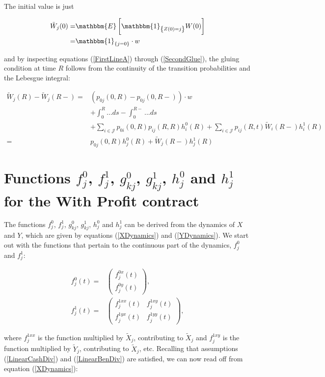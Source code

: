 \documentclass{article}
\newcommand{\1}[1]{\mathbbm{1}_{\left\lbrace #1 \right\rbrace}}
\newcommand{\expec}[1][def]{\mathbbm{E} \left[ #1 \right]}
\theoremstyle{break}
\theoremstyle{remark}
\numberwithin{equation}{section}
\begin{document}
\begin{appendices}
The initial value is just

\begin{align*}
	\tilde{W}_j(0) =& \expec[\1{Z(0)=j} W(0)] \\
	=& \1{j=0} \cdot w
\end{align*}

and by inspecting equations (\ref{FirstLineA}) through (\ref{SecondGlue}), the gluing condition at time $R$ follows from the continuity of the transition probabilities and the Lebesgue integral:

\begin{align*}
	\tilde{W}_j(R) - \tilde{W}_j(R-) =& \left(p_{0j}(0,R) - p_{0j}(0,R-)\right) \cdot w \\
	&+ \int_0^R ... ds - \int_0^{R-} ... ds \\
	&+ \sum_{i \in \mathcal{J}} p_{0i}(0,R) p_{ij}(R,R) h_i^0(R) + \sum_{i \in \mathcal{J}} p_{ij}(R,t) \tilde{W}_i(R-) h_i^1(R) \\
	=& p_{0j}(0,R) h_j^0(R) + \tilde{W}_j(R-) h_j^1(R)
\end{align*}

\newpage
\section{Functions $f_j^0$, $f_j^1$, $g_{kj}^0$, $g_{kj}^1$, $h_j^0$ and $h_j^1$ for the With Profit contract} \label{AppendixFunctions}

The functions $f_j^0$, $f_j^1$, $g_{kj}^0$, $g_{kj}^1$, $h_j^0$ and $h_j^1$ can be derived from the dynamics of $X$ and $Y$, which are given by equations (\ref{XDynamics}) and (\ref{YDynamics}). We start out with the functions that pertain to the continuous part of the dynamics, $f_j^0$ and $f_j^1$:

\begin{align*}
f_j^0(t) =&
\begin{pmatrix}
	f_j^{0x}(t) \\
	f_j^{0y}(t) 
\end{pmatrix}, \\
f_j^1(t) =&
\begin{pmatrix}
	f_j^{1xx}(t) & f_j^{1xy}(t) \\
	f_j^{1yx}(t) & f_j^{1yy}(t)
\end{pmatrix},
\end{align*}

where $f_j^{1xx}$ is the function multiplied by $\tilde{X}_j$, contributing to $\tilde{X}_j$ and $f_j^{1xy}$ is the function multiplied by $\tilde{Y}_j$, contributing to $\tilde{X}_j$, etc. Recalling that assumptions (\ref{LinearCashDiv}) and (\ref{LinearBenDiv}) are satisfied, we can now read off from equation (\ref{XDynamics}):


\end{appendices}
\end{document}
